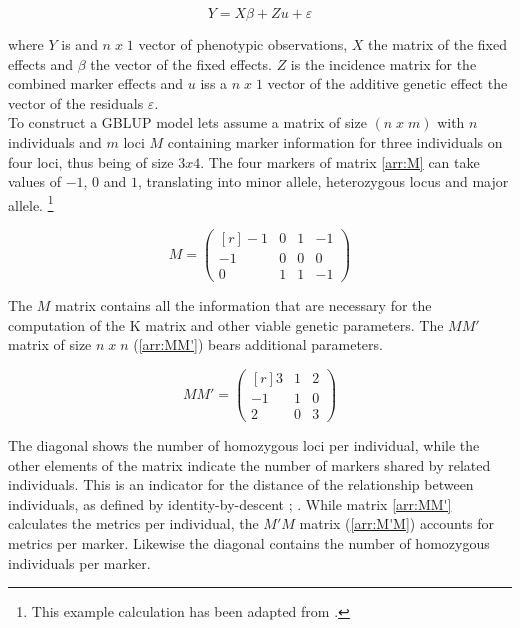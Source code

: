 \begin{equation}
Y = X \beta + Zu + \varepsilon
 \label{eqn:blup}
\end{equation}

where $Y$ is and $n\;x\;1$ vector of phenotypic observations, $X$ the matrix of the fixed
effects and $\beta$ the vector of the fixed effects. $Z$ is the incidence matrix for the
combined marker effects and $u$ iss a $n\; x\; 1$ vector of the additive genetic effect
the vector of the residuals $\varepsilon$.\\
To construct a GBLUP model lets assume a matrix of size $(n\; x\; m)$ with $n$ individuals
and $m$ loci $M$ containing marker information for three individuals on four loci, thus being of
size $3x4$. The four markers of matrix \ref{arr:M} can take values of $-1$, $0$ and $1$,
translating into minor allele, heterozygous locus and major allele. \footnote{This example
calculation has been adapted from \cite{isik2013}.}

\begin{equation}
 M = 
 \begin{pmatrix}[r]
  -1 & 0 & 1 & -1 \\
  -1 & 0 & 0 & 0 \\
   0 & 1 & 1 & -1 
 \end{pmatrix}
 \label{arr:M}
\end{equation}

The $M$ matrix contains all the information that are necessary for the computation of the K matrix and other viable genetic parameters. The $MM'$ matrix of size $n\; x\; n$ (\ref{arr:MM'}) bears additional parameters.

\begin{equation}
 MM' = 
 \begin{pmatrix}[r]
  3 & 1 & 2 \\
  -1 & 1 & 0 \\
  2 & 0 & 3 
 \end{pmatrix}
 \label{arr:MM'}
\end{equation}

The diagonal shows the number of homozygous loci per individual, while the other elements
of the matrix indicate the number of markers shared by related individuals. This is an
indicator for the distance of the relationship between individuals, as defined by
identity-by-descent \cite{vanraden2008efficient}; \cite{misztal2013methods}. While matrix
\ref{arr:MM'} calculates the metrics per individual, the $M'M$ matrix (\ref{arr:M'M})
accounts for metrics per marker. Likewise the diagonal contains the number of homozygous
individuals per marker.

